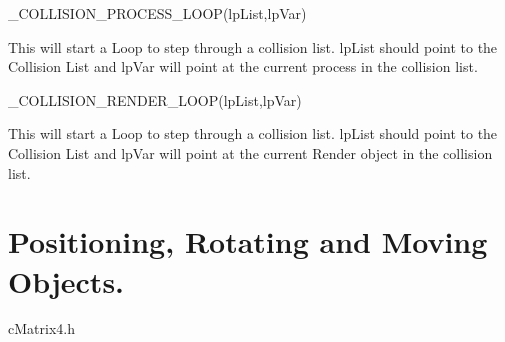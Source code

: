 \begin{DoxyItemize}
\begin{DoxyItemize}
\end{DoxyItemize}
\item \_\-COLLISION\_\-PROCESS\_\-LOOP(lpList,lpVar)
\begin{DoxyItemize}
\item This will start a Loop to step through a collision list. lpList should point to the Collision List and lpVar will point at the current process in the collision list.\par

\end{DoxyItemize}
\item \_\-COLLISION\_\-RENDER\_\-LOOP(lpList,lpVar)
\begin{DoxyItemize}
\item This will start a Loop to step through a collision list. lpList should point to the Collision List and lpVar will point at the current Render object in the collision list.\par

\end{DoxyItemize}
\end{DoxyItemize}\hypertarget{_reference_lists_MatrixUsagePage}{}\section{Positioning, Rotating and Moving Objects.}\label{_reference_lists_MatrixUsagePage}
cMatrix4.h \par


